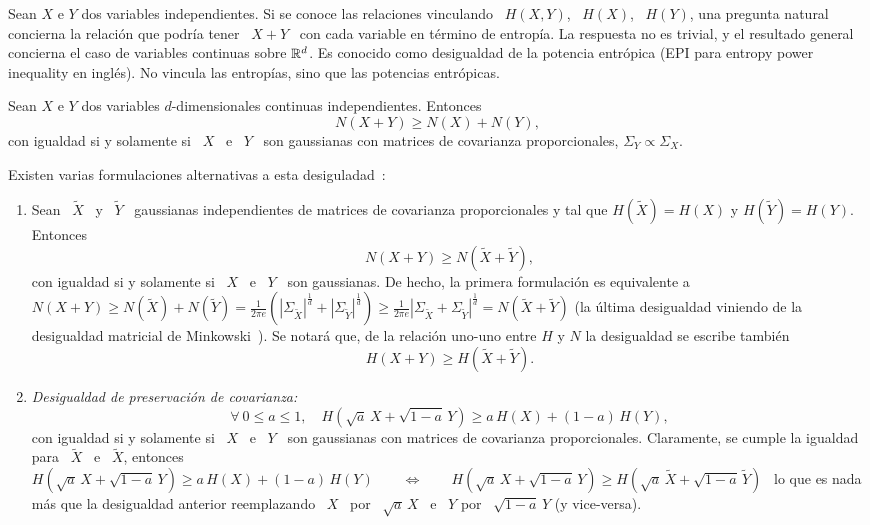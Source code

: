 Sean  $X$ e  $Y$  dos variables  independientes.   Si se  conoce las  relaciones
vinculando \  $H(X,Y)$, \  $H(X)$, \ $H(Y)$,  una pregunta natural  concierna la
relaci\'on  que podr\'ia  tener \  $X+Y$  \ con  cada variable  en t\'ermino  de
entrop\'ia. La respuesta no es trivial, y el resultado general concierna el caso
de  variables continuas  sobre $\mathbb{R}^d$.   Es conocido  como desigualdad  de la
potencia entr\'opica (EPI para entropy power inequality en ingl\'es). No vincula
las entrop\'ias, sino que las potencias entr\'opicas.
%
\begin{teorema}
\label{Teo:SZ:EPI}
%
  Sean  $X$  e $Y$  dos  variables  $d$-dimensionales continuas  independientes.
  Entonces
  \[
  N(X + Y) \ge N(X) + N(Y),
  \]
%
  con igualdad si y  solamente si \ $X$ \ e \ $Y$  \ son gaussianas con matrices
  de covarianza proporcionales, $\Sigma_Y \propto \Sigma_X$.
\end{teorema}
%
\noindent     Existen    varias     formulaciones     alternativas    a     esta
desiguladad~\cite{Sha48, Lie78, CovTho06, DemCov91, Rio07}:
%
\begin{enumerate}
\item\label{EPI:SZ:EquivGauss} Sean  \ $\widetilde{X}$  \ y \  $\widetilde{Y}$ \
  gaussianas independientes  de matrices de covarianza proporcionales  y tal que
  $H(\widetilde{X}) = H(X)$ y $H(\widetilde{Y}) = H(Y)$.  Entonces
  \[
  N(X+Y) \ge N\left( \widetilde{X} + \widetilde{Y} \right),
  \]
  con igualdad si y solamente si \ $X$  \ e \ $Y$ \ son gaussianas. De hecho, la
  primera  formulaci\'on  es equivalente  a  $N(X+Y)  \ge N\left(  \widetilde{X}
  \right) +  N\left( \widetilde{Y}  \right) = \frac{1}{2  \pi e}  \left( \left|
      \Sigma_{\widetilde{X}}  \right|^{\frac1d} +  \left| \Sigma_{\widetilde{Y}}
    \right|^{\frac1d}     \right)    \ge     \frac{1}{2    \pi     e}    \left|
    \Sigma_{\widetilde{X}} +  \Sigma_{\widetilde{Y}} \right|^{\frac1d} = N\left(
    \widetilde{X} + \widetilde{Y} \right)$  (la \'ultima desigualdad viniendo de
  la  desigualdad matricial de  Minkowski~\cite{HarLit52, Min10}).   Se notar\'a
  que,  de la  relaci\'on uno-uno  entre  $H$ y  $N$ la  desigualdad se  escribe
  tambi\'en \[ H(X+Y) \ge H\left( \widetilde{X} + \widetilde{Y} \right).\]
%
\item\label{EPI:SZ:PresCov}    {\it    Desigualdad    de    preservaci\'on    de
    covarianza:}
  \[
  \forall  \:   0  \le  a  \le   1,  \quad  H\left(   \sqrt{a} \, X  +
    \sqrt{1-a} \, Y \right) \ge a \, H(X) + (1-a) \, H(Y),
  \]
  con igualdad si y solamente si \ $X$ \ e \ $Y$ \ son gaussianas con matrices de
  covarianza  proporcionales.    Claramente,  se  cumple  la   igualdad  para  \
  $\widetilde{X}$  \ e  \ $\widetilde{X}$,  entonces  $H\left( \sqrt{a}  \, X  +
    \sqrt{1-a} \, Y \right) \ge a \, H(X) + (1-a) \, H(Y) \qquad \Leftrightarrow
  \qquad H\left( \sqrt{a} \, X + \sqrt{1-a} \, Y \right) \ge H\left( \sqrt{a} \,
    \widetilde{X} + \sqrt{1-a} \, \widetilde{Y} \right) $ \ lo que es nada m\'as
  que la desigualdad anterior  reemplazando \ $X$ \ por \ $\sqrt{a}  \, X$ \ e \
  $Y$ por \ $\sqrt{1-a} \, Y$ (y vice-versa).
\end{enumerate}

